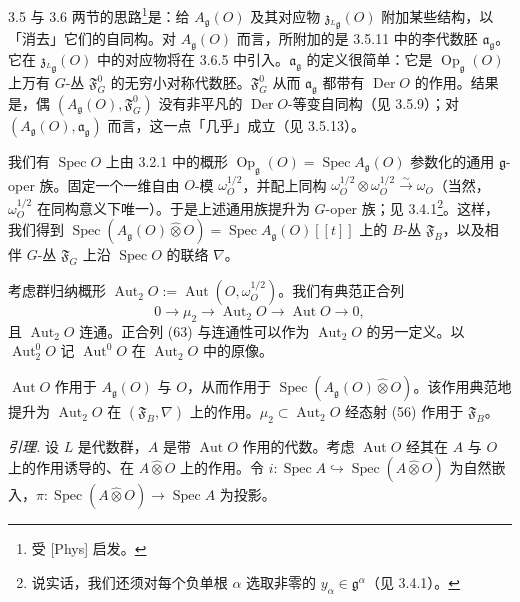 3.5 与 3.6 两节的思路\footnote{受 [Phys] 启发。}是：给 $A_{\mathfrak{g}}(O)$ 及其对应物 $\mathfrak{z}_{{}^{L}\mathfrak{g}}(O)$ 附加某些结构，以「消去」它们的自同构。对 $A_{\mathfrak{g}}(O)$ 而言，所附加的是 3.5.11 中的李代数胚 $\mathfrak{a}_{\mathfrak{g}}$。它在 $\mathfrak{z}_{{}^{L}\mathfrak{g}}(O)$ 中的对应物将在 3.6.5 中引入。$\mathfrak{a}_{\mathfrak{g}}$ 的定义很简单：它是 $\operatorname{Op}_{\mathfrak{g}}(O)$ 上万有 $G$-丛 $\mathfrak{F}^{0}_{G}$ 的无穷小对称代数胚。$\mathfrak{F}^{0}_{G}$ 从而 $\mathfrak{a}_{\mathfrak{g}}$ 都带有 $\operatorname{Der}O$ 的作用。结果是，偶 $(A_{\mathfrak{g}}(O),\mathfrak{F}^{0}_{G})$ 没有非平凡的 $\operatorname{Der}O$-等变自同构（见 3.5.9）；对 $(A_{\mathfrak{g}}(O),\mathfrak{a}_{\mathfrak{g}})$ 而言，这一点「几乎」成立（见 3.5.13）。

 我们有 $\operatorname{Spec}O$ 上由 3.2.1 中的概形 $\operatorname{Op}_{\mathfrak{g}}(O)=\operatorname{Spec}A_{\mathfrak{g}}(O)$ 参数化的通用 $\mathfrak{g}$-oper 族。固定一个一维自由 $O$-模 $\omega_{O}^{1/2}$，并配上同构 $\omega_{O}^{1/2}\otimes\omega_{O}^{1/2}\xrightarrow{\sim}\omega_{O}$（当然，$\omega_{O}^{1/2}$ 在同构意义下唯一）。于是上述通用族提升为 $G$-oper 族；见 3.4.1\footnote{说实话，我们还须对每个负单根 $\alpha$ 选取非零的 $y_{\alpha}\in\mathfrak{g}^{\alpha}$（见 3.4.1）。}。这样，我们得到 $\operatorname{Spec}(A_{\mathfrak{g}}(O)\widehat\otimes O)=\operatorname{Spec}A_{\mathfrak{g}}(O)[[t]]$ 上的 $B$-丛 $\mathfrak{F}_{B}$，以及相伴 $G$-丛 $\mathfrak{F}_{G}$ 上沿 $\operatorname{Spec}O$ 的联络 $\nabla$。

 考虑群归纳概形 $\operatorname{Aut}_{2}O:=\operatorname{Aut}(O,\omega_{O}^{1/2})$。我们有典范正合列
\begin{equation}\tag{63}
0\to\mu_{2}\to\operatorname{Aut}_{2}O\to\operatorname{Aut}O\to0,
\end{equation}
且 $\operatorname{Aut}_{2}O$ 连通。正合列 (63) 与连通性可以作为 $\operatorname{Aut}_{2}O$ 的另一定义。以 $\operatorname{Aut}_{2}^{0}O$ 记 $\operatorname{Aut}^{0}O$ 在 $\operatorname{Aut}_{2}O$ 中的原像。

$\operatorname{Aut}O$ 作用于 $A_{\mathfrak{g}}(O)$ 与 $O$，从而作用于 $\operatorname{Spec}(A_{\mathfrak{g}}(O)\widehat\otimes O)$。该作用典范地提升为 $\operatorname{Aut}_{2}O$ 在 $(\mathfrak{F}_{B},\nabla)$ 上的作用。$\mu_{2}\subset\operatorname{Aut}_{2}O$ 经态射 (56) 作用于 $\mathfrak{F}_{B}$。

 \emph{引理.} 设 $L$ 是代数群，$A$ 是带 $\operatorname{Aut}O$ 作用的代数。考虑 $\operatorname{Aut}O$ 经其在 $A$ 与 $O$ 上的作用诱导的、在 $A\widehat\otimes O$ 上的作用。令 $i:\operatorname{Spec}A\hookrightarrow\operatorname{Spec}(A\widehat\otimes O)$ 为自然嵌入，$\pi:\operatorname{Spec}(A\widehat\otimes O)\to\operatorname{Spec}A$ 为投影。

